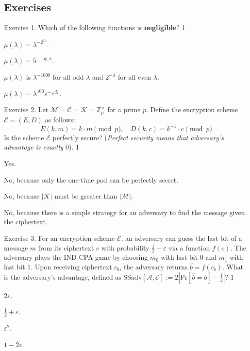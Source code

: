 \documentclass[../lecture-notes-148x210.tex]{subfiles}
\begin{document}
\subsection{Exercises}

\begin{xexercise}
    {Exercise 1.}
    {Which of the following functions is \textbf{negligible}?}
    {1}
    {
        \item $\mu(\lambda) = \lambda^{-2^{10}}$.
        \item $\mu(\lambda) = 5^{-\log\lambda}$.
        \item $\mu(\lambda)$ is $\lambda^{-1000}$ for all odd $\lambda$ and $2^{-\lambda}$ for all even $\lambda$.
        \item $\mu(\lambda) = \lambda^{100}e^{-\sqrt{\lambda}}$.
    }
\end{xexercise}

\begin{xexercise}
    {Exercise 2.}
    {Let $\mathcal{M}=\mathcal{C}=\mathcal{K}=\mathbb{Z}_{p}^{\times}$ for a prime $p$. Define the encryption scheme $\mathcal{E}=(E,D)$ as follows:
    \begin{equation*}
        E(k,m) = k \cdot m \pmod{p}, \quad D(k,c) = k^{-1} \cdot c \pmod{p}
    \end{equation*}
    Is the scheme $\mathcal{E}$ perfectly secure? (\textit{Perfect security
    means that adversary's advantage is exactly $0$}).} {1} {
        \item Yes.
        \item No, because only the one-time pad can be perfectly secret.
        \item No, because $|\mathcal{K}|$ must be greater than $|\mathcal{M}|$.
        \item No, because there is a simple strategy for an adversary to find the message given the ciphertext.
    }
\end{xexercise}

\begin{xexercise}
    {Exercise 3.}
    {For an encryption scheme $\mathcal{E}$, an adversary can guess the last bit of a message $m$ from its ciphertext $c$ with probability $\frac{1}{2}+\varepsilon$ via a function $f(c)$. The adversary plays the IND-CPA game by choosing $m_0$ with last bit 0 and $m_1$ with last bit 1. Upon receiving ciphertext $c_b$, the adversary returns $\hat{b} = f(c_b)$. What is the adversary's advantage, defined as $\text{SSadv}[\mathcal{A},\mathcal{E}] := 2\left|\text{Pr}[\hat{b}=b]-\frac{1}{2}\right|$?}
    {1}
    {
        \item $2\varepsilon$.
        \item $\frac{1}{2}+\varepsilon$.
        \item $\varepsilon^2$.
        \item $1-2\varepsilon$.
    }
\end{xexercise}
\end{document}
